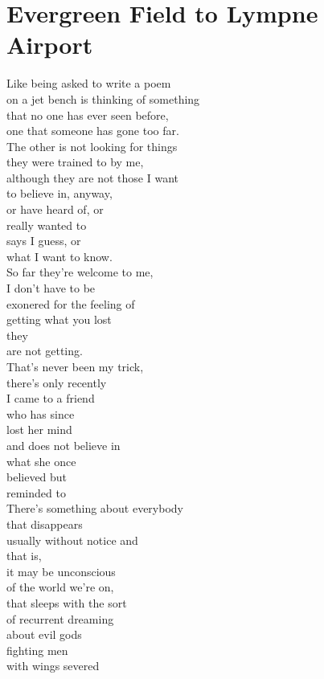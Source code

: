 \documentclass[smalldemyvopaper,11pt,twoside,onecolumn,openright,extrafontsizes]{memoir}
\begin{document}
\chapter{Evergreen Field to Lympne Airport}
Like being asked to write a poem
\\on a jet bench is thinking of something
\\that no one has ever seen before,
\\one that someone has gone too far.
\\The other is not looking for things
\\they were trained to by me,
\\although they are not those I want
\\to believe in, anyway,
\\or have heard of, or
\\really wanted to
\\says I guess, or
\\what I want to know.
\\So far they're welcome to me,
\\I don't have to be
\\exonered for the feeling of
\\getting what you lost
\\they
\\are not getting.
\\That's never been my trick,
\\there's only recently
\\I came to a friend
\\who has since
\\lost her mind
\\and does not believe in
\\what she once
\\believed but
\\reminded to
\\There's something about everybody
\\that disappears
\\usually without notice and
\\that is,
\\it may be unconscious
\\of the world we're on,
\\that sleeps with the sort
\\of recurrent dreaming
\\about evil gods
\\fighting men
\\with wings severed
\end{document}
